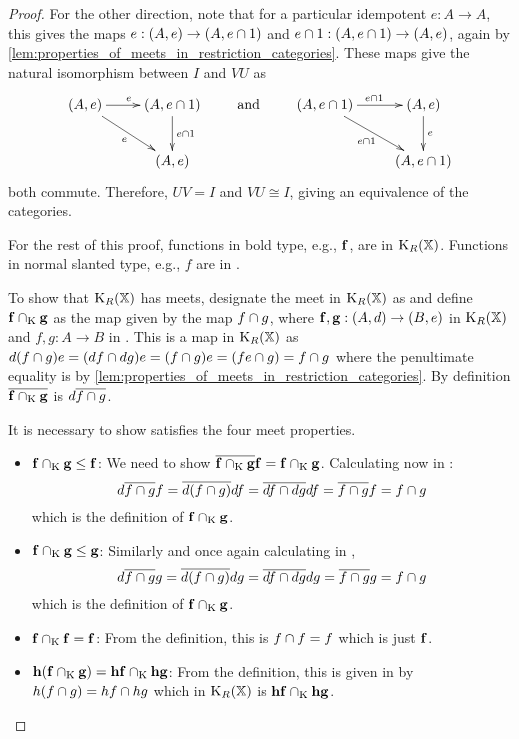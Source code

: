 \begin{proof}
  For the other direction,  note that for a particular idempotent $e:A\to A$,  this gives the
  maps $e:(A,e)\to(A,e\cap 1)$ and $e\cap 1 : (A,e\cap 1) \to (A,e)$, again by
  \ref{lem:properties_of_meets_in_restriction_categories}. These maps give the natural
  isomorphism between $I$ and $V U$ as
  \[
    \xymatrix{
      (A,e)\ar[r]^e \ar[dr]_{e} &(A,e\meet 1)\ar[d]^{e\meet 1}\\
      &(A,e)
    }\qquad \text{ and  }\qquad
    \xymatrix{
      (A,e\meet 1)\ar[r]^{e\meet 1} \ar[dr]_{e\meet 1} &(A,e)\ar[d]^{e}\\
      &(A,e\meet 1)
    }
  \]
  both commute. Therefore, $U V = I$ and $V U \cong I$, giving an equivalence of the categories.

  For the rest of this proof, functions in bold type, e.g., $\mathbf{f}$, are in $\text{K}_{R}(\mathbb{X})$.
  Functions in normal slanted type, e.g., $f$ are in \X.

  To show that $\text{K}_{R}(\mathbb{X})$ has meets,  designate the meet in $\text{K}_{R}(\mathbb{X})$ as \meetspl
  and define $\mathbf{f} \cap_{\text{K}} \mathbf{g}$ as the map given by the \X map $f \cap g$, where
  $\mathbf{f},\mathbf{g}:(A,d)\to(B,e)$ in $\text{K}_{R}(\mathbb{X})$ and $f,g:A\to B$ in \X . This is
  a map in $\text{K}_{R}(\mathbb{X})$ as
  $d(f \cap g)e = (d\hspace{0.1pt} f \cap d\hspace{0.1pt} g) e = (f \cap g) e = (f e \cap g) = f\cap g$
  where the penultimate equality is by
  \ref{lem:properties_of_meets_in_restriction_categories}.
  By definition $\overline{\mathbf{f} \cap_{\text{K}} \mathbf{g} }$ is $d\overline{f\cap g}$.

  It is necessary to show \meetspl satisfies the four meet properties.
  \begin{itemize}
    \item{$\mathbf{f}\cap_{\text{K}} \mathbf{g} \le \mathbf{f}$: } We need to show
      $\overline{\mathbf{f} \cap_{\text{K}} \mathbf{g}} \mathbf{f} =  \mathbf{f} \cap_{\text{K}} \mathbf{g}$.  Calculating now in \X:
      \[
        d \overline{f \cap g} f= \overline{d(f\cap g)} d f  = \overline{d f \cap d g} d f
         = \overline{f \cap g} f  = f \cap g
      \]
      which is the definition of $\mathbf{f} \cap_{\text{K}} \mathbf{g}$.
    \item{$\mathbf{f}\cap_{\text{K}} \mathbf{g} \le \mathbf{g}$: } Similarly and once again calculating in \X,
      \[
        d \overline{f \cap g} g = \overline{d(f\cap g)} d g  = \overline{d f \cap d g} d g
         = \overline{f \cap g} g  = f \cap g
      \]
      which is the definition of $\mathbf{f} \cap_{\text{K}} \mathbf{g}$.
    \item{$\mathbf{f}\cap_{\text{K}} \mathbf{f} = \mathbf{f}$: } From the definition, this is $f \cap f = f$ which
      is just $ \mathbf{f}$.
    \item{$\mathbf{h}(\mathbf{f}\cap_{\text{K}} \mathbf{g}) = \mathbf{h}\mathbf{f} \cap_{\text{K}} \mathbf{h}\mathbf{g}$: }
      From the definition, this is given in \X by $ h (f \cap g) =
      h f \cap h g$ which in $\text{K}_{R}(\mathbb{X})$ is $\mathbf{h}\mathbf{f} \cap_{\text{K}} \mathbf{h}\mathbf{g}$.
  \end{itemize}
\end{proof}

